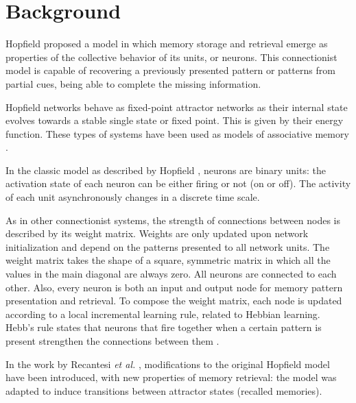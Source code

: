 \section{Background}

Hopfield \parencite{hopfield1982} proposed a model in which memory storage and retrieval emerge as properties of the collective behavior of its units, or neurons.
This connectionist model is capable of recovering a previously presented pattern or patterns from partial cues, being able to complete the missing information. 

Hopfield networks behave as fixed-point attractor networks as their internal state evolves towards a stable single state or fixed point.
This is given by their energy function.
These types of systems have been used as models of associative memory \parencite{amit1992}.

In the classic model as described by Hopfield \parencite{hopfield1982}, neurons are binary units: the activation state of each neuron can be either firing or not (on or off). The activity of each unit asynchronously changes in a discrete time scale.

As in other connectionist systems, the strength of connections between nodes is described by its weight matrix.
Weights are only updated upon network initialization and depend on the patterns presented to all network units.
The weight matrix takes the shape of a square, symmetric matrix in which all the values in the main diagonal are always zero.
All neurons are connected to each other.
Also, every neuron is both an input and output node for memory pattern presentation and retrieval.
To compose the weight matrix, each node is updated according to a local incremental learning rule, related to Hebbian learning.
Hebb's rule states that neurons that fire together when a certain pattern is present strengthen the connections between them \parencite{hebb1949}.

In the work by Recantesi \textit{et al.} \parencite{recanatesi2015}, modifications to the original Hopfield model have been introduced, with new properties of memory retrieval: the model was adapted to induce transitions between attractor states (recalled memories).